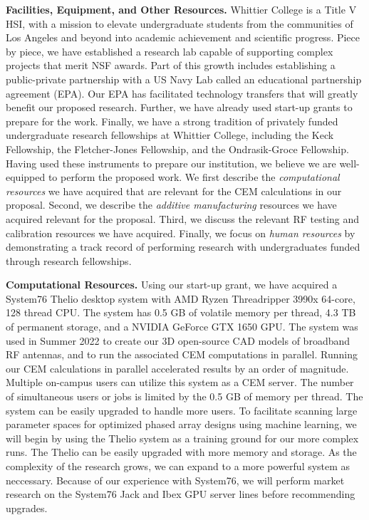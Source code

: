 \documentclass[../../main.tex]{subfiles}
\begin{document}
\label{sec:fac_equip_res}

\textbf{Facilities, Equipment, and Other Resources.}  Whittier College is a Title V HSI, with a mission to elevate undergraduate students from the communities of Los Angeles and beyond into academic achievement and scientific progress.  Piece by piece, we have established a research lab capable of supporting complex projects that merit NSF awards.  Part of this growth includes establishing a public-private partnership with a US Navy Lab called an educational partnership agreement (EPA).  Our EPA has facilitated technology transfers that will greatly benefit our proposed research.  Further, we have already used start-up grants to prepare for the work.  Finally, we have a strong tradition of privately funded undergraduate research fellowships at Whittier College, including the Keck Fellowship, the Fletcher-Jones Fellowship, and the Ondrasik-Groce Fellowship.  Having used these instruments to prepare our institution, we believe we are well-equipped to perform the proposed work.  We first describe the \textit{computational resources} we have acquired that are relevant for the CEM calculations in our proposal.  Second, we describe the \textit{additive manufacturing} resources we have acquired relevant for the proposal.  Third, we discuss the relevant RF testing and calibration resources we have acquired.  Finally, we focus on \textit{human resources} by demonstrating a track record of performing research with undergraduates funded through research fellowships. \\ \vspace{2.5mm}

\textbf{Computational Resources.} Using our start-up grant, we have acquired a System76 Thelio desktop system with AMD Ryzen Threadripper 3990x 64-core, 128 thread CPU.  The system has 0.5 GB of volatile memory per thread, 4.3 TB of permanent storage, and a NVIDIA GeForce GTX 1650 GPU.  The system was used in Summer 2022 to create our 3D open-source CAD models of broadband RF antennas, and to run the associated CEM computations in parallel.  Running our CEM calculations in parallel accelerated results by an order of magnitude.  Multiple on-campus users can utilize this system as a CEM server.  The number of simultaneous users or jobs is limited by the 0.5 GB of memory per thread.  The system can be easily upgraded to handle more users.  To facilitate scanning large parameter spaces for optimized phased array designs using machine learning, we will begin by using the Thelio system as a training ground for our more complex runs.  The Thelio can be easily upgraded with more memory and storage.  As the complexity of the research grows, we can expand to a more powerful system as neccessary.  Because of our experience with System76, we will perform market research on the System76 Jack and Ibex GPU server lines before recommending upgrades.  \\ \vspace{2.5mm}
\end{document}
